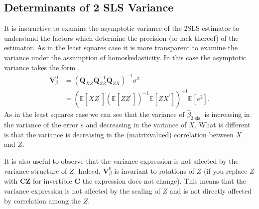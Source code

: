 \documentclass[10pt]{article}
\begin{document}
\subsection{Determinants of 2 SLS Variance}
It is instructive to examine the asymptotic variance of the 2SLS estimator to understand the factors which determine the precision (or lack thereof) of the estimator. As in the least squares case it is more transparent to examine the variance under the assumption of homoskedasticity. In this case the asymptotic variance takes the form
$$
\begin{aligned}
\boldsymbol{V}_{\beta}^{0} &=\left(\boldsymbol{Q}_{X Z} \boldsymbol{Q}_{Z Z}^{-1} \boldsymbol{Q}_{Z X}\right)^{-1} \sigma^{2} \\
&=\left(\mathbb{E}\left[X Z^{\prime}\right]\left(\mathbb{E}\left[Z Z^{\prime}\right]\right)^{-1} \mathbb{E}\left[Z X^{\prime}\right]\right)^{-1} \mathbb{E}\left[e^{2}\right] .
\end{aligned}
$$
As in the least squares case we can see that the variance of $\widehat{\beta}_{2 \text { sls }}$ is increasing in the variance of the error $e$ and decreasing in the variance of $X$. What is different is that the variance is decreasing in the (matrixvalued) correlation between $X$ and $Z$.

It is also useful to observe that the variance expression is not affected by the variance structure of $Z$. Indeed, $\boldsymbol{V}_{\beta}^{0}$ is invariant to rotations of $Z$ (if you replace $Z$ with $\boldsymbol{C Z}$ for invertible $\boldsymbol{C}$ the expression does not change). This means that the variance expression is not affected by the scaling of $Z$ and is not directly affected by correlation among the $Z$.
\end{document}

